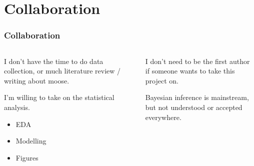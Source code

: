 \documentclass[compress, aspectratio=169]{beamer}
\begin{document}
\section{Collaboration}

\begin{frame}
	\frametitle{Collaboration}
	\begin{columns}
	\begin{column}{0.5\textwidth}
	\begin{xmarker}
	I don't have the time to do data collection, or much literature review / writing about moose.
	\end{xmarker}
	\begin{cmarker}
	I'm willing to take on the statistical analysis.
	\begin{itemize}
		\item EDA
		\item Modelling
		\item Figures
	\end{itemize}
	\end{cmarker}
	\end{column}
	\begin{column}{0.5\textwidth}
	\begin{cmarker}
	I don't need to be the first author if someone wants to take this project on.
	\end{cmarker}
	\begin{imarker}
	Bayesian inference is mainstream, but not understood or accepted everywhere.
	\end{imarker}
	\end{column}
	\end{columns}
\end{frame}
\end{document}
